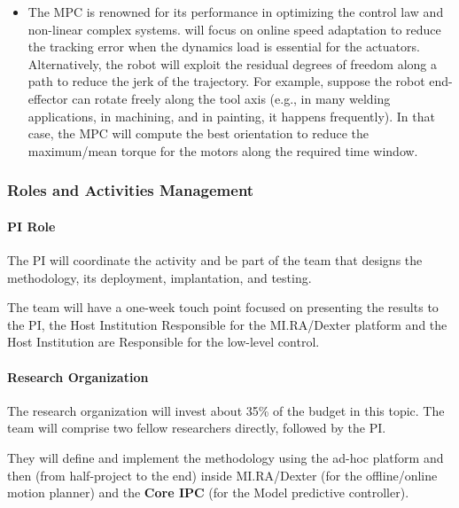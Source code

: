 \begin{itemize}[arrow]
  \begin{itemize}
  \item
    The MPC is renowned for its performance in optimizing the control
    law and non-linear complex systems.  will focus on
    online speed adaptation to reduce the tracking error when the
    dynamics load is essential for the actuators. Alternatively, the
    robot will exploit the residual degrees of freedom along a path to
    reduce the jerk of the trajectory. For example, suppose the robot
    end-effector can rotate freely along the tool axis (e.g., in many
    welding applications, in machining, and in painting, it happens
    frequently). In that case, the MPC will compute the best orientation
    to reduce the maximum/mean torque for the motors along the required
    time window.
  \end{itemize}
\end{itemize}

\subsubsection{\texorpdfstring{Roles and Activities Management
}{Roles and Activities Management }}\label{roles-and-activities-management-1}

\paragraph{PI Role}\label{pi-role-1}

The PI will coordinate the activity and be part of the team that designs
the methodology, its deployment, implantation, and testing.

The team will have a one-week touch point focused on presenting the
results to the PI, the Host Institution Responsible for the MI.RA/Dexter
platform and the Host Institution are Responsible for the low-level
control.

\paragraph{Research Organization}\label{research-organization-1}

The research organization will invest about 35\% of the budget in this
topic. The team will comprise two fellow researchers directly, followed
by the PI.

They will define and implement the methodology using the ad-hoc platform
and then (from half-project to the end) inside MI.RA/Dexter (for the
offline/online motion planner) and the \textbf{Core IPC} (for the Model
predictive controller).

